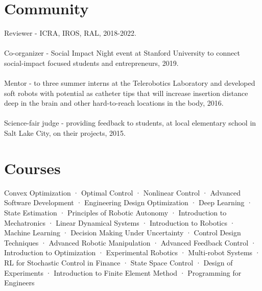 \documentclass[10pt]{article}
\begin{document}
\section*{Community}
Reviewer - ICRA, IROS, RAL, 2018-2022.
\\
\\
Co-organizer - Social Impact Night event at Stanford University to connect social-impact focused students and entrepreneurs, 2019.
\\
\\
Mentor - to three summer interns at the Telerobotics Laboratory and developed soft robots with potential as catheter tips that will increase insertion distance deep in the brain and other hard-to-reach locations in the body, 2016.
\\
\\
Science-fair judge - providing feedback to students, at local elementary school in Salt Lake City, on their projects, 2015.

\section*{Courses}
Convex Optimization · Optimal Control · Nonlinear Control · Advanced Software Development · Engineering Design Optimization · Deep Learning · State Estimation · Principles of Robotic Autonomy · Introduction to Mechatronics · Linear Dynamical Systems · Introduction to Robotics · Machine Learning · Decision Making Under Uncertainty · Control Design Techniques · Advanced Robotic Manipulation · Advanced Feedback Control · Introduction to Optimization · Experimental Robotics · Multi-robot Systems · RL for Stochastic Control in Finance · State Space Control · Design of Experiments · Introduction to Finite Element Method · Programming for Engineers 
\end{document}
